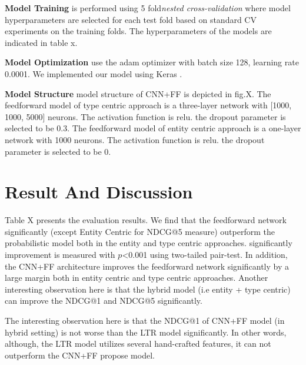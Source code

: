 \textbf{Model Training} is performed using 5 fold\textit{nested cross-validation} \cite{cawley2010over} where model hyperparameters are selected for each test fold based on standard CV experiments on the training folds. The hyperparameters of the models are indicated in table x.

\textbf{Model Optimization} use the adam optimizer with batch size 128, learning rate 0.0001. We implemented our model using Keras \cite{chollet2015keras}.

\textbf{Model Structure} model structure of CNN+FF is depicted in fig.X. The feedforward model of type centric approach is a three-layer network with [1000, 1000, 5000] neurons. The activation function is relu. the dropout parameter is selected to be 0.3. The feedforward model of entity centric approach is a one-layer network with 1000 neurons. The activation function is relu. the dropout parameter is selected to be 0.


\section{Result And Discussion}
Table X presents the evaluation results. We find that the feedforward network significantly (except Entity Centric for NDCG@5 measure) outperform the probabilistic model both in the entity and type centric approaches. significantly improvement is measured with $p$<0.001 using two-tailed pair-test. In addition, the CNN+FF architecture improves the feedforward network significantly by a large margin both in entity centric and type centric approaches. Another interesting observation here is that the hybrid model (i.e entity + type centric) can improve the NDCG@1 and NDCG@5 significantly.

The interesting observation here is that the NDCG@1 of CNN+FF model (in hybrid setting) is not worse than the LTR model significantly. In other words, although, the LTR model utilizes several hand-crafted features, it can not outperform the CNN+FF propose model.

